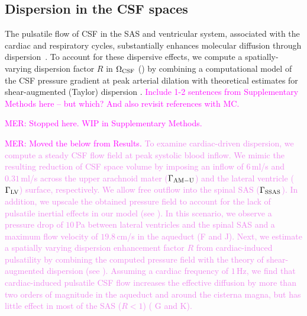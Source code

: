 \documentclass[fleqn,10pt]{wlscirep}
\newcommand{\mer}[1]{\textcolor{magenta}{#1}}
\newcommand{\mar}[1]{\textcolor{violet}{#1}}
\begin{document}
\subsection{Dispersion in the CSF spaces}
\label{sec:csf_dispersion}

The pulsatile flow of CSF in the SAS and ventricular system,
associated with the cardiac and respiratory cycles, substantially
enhances molecular diffusion through
dispersion~\cite{taylor1953dispersion, watson1983diffusion,
  asgari2016glymphatic, keith2019dispersion, ray2021quantitative,
  troyetsky2021dispersion}. To account for these dispersive effects,
we compute a spatially-varying dispersion factor $R$ in $\Omega_{\rm
  CSF}$ () by combining a computational model of
the CSF pressure gradient at peak arterial dilation with theoretical
estimates for shear-augmented (Taylor) dispersion
\cite{taylor1953dispersion, watson1983diffusion, keith2019dispersion}. \mer{Include 1-2 sentences from Supplementary Methods here -- but which? And also revisit references with MC.}

\mer{MER: Stopped here. WIP in Supplementary Methods. }

\mer{MER: Moved the below from Results.}
\mar{To examine cardiac-driven dispersion, we compute a steady CSF flow field at peak systolic blood inflow. We mimic the resulting reduction of CSF space volume by imposing an inflow of $6\,$ml/s \cite{baledent2014imaging, causemann2022human} and $0.31\,$ml/s \cite{vinje2019respiratory} across the upper arachnoid mater ($\Gamma_{\rm AM-U}$) and the lateral ventricle ($\Gamma_{\rm LV}$) surface, respectively. We allow free outflow into the spinal SAS ($\Gamma_{\rm SSAS}$). In addition, we upscale the obtained pressure field to account for the lack of pulsatile inertial effects in our model (see \Cref{sec:csf_dispersion}). In this scenario, we observe a pressure drop of $10\,$Pa between lateral ventricles and the spinal SAS and a maximum flow velocity of $19.8\,$cm/s in the aqueduct (\Cref{fig:csf}F and J).
Next, we estimate a spatially varying dispersion enhancement factor $R$ from cardiac-induced pulsatility by combining the computed pressure field with the theory of shear-augmented dispersion (see \Cref{sec:csf_dispersion}). Assuming a cardiac frequency of $1\,$Hz, we find that cardiac-induced pulsatile CSF flow increases the effective diffusion by more than two orders of magnitude in the aqueduct and around the cisterna magna, but has little effect in most of the SAS ($R < 1$) (\Cref{fig:csf} G and K). }
\end{document}

